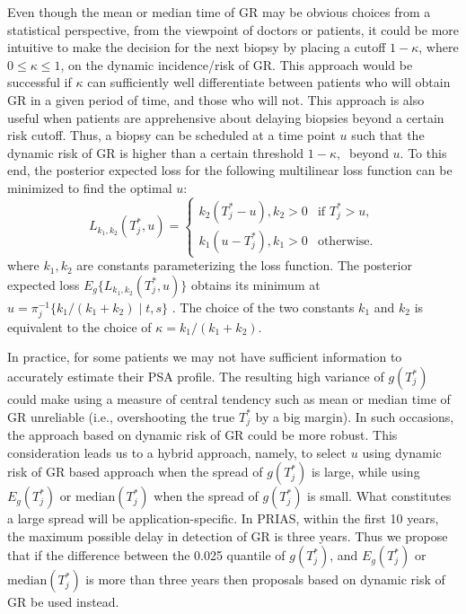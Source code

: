 Even though the mean or median time of GR may be obvious choices from a statistical perspective, from the viewpoint of doctors or patients, it could be more intuitive to make the decision for the next biopsy by placing a cutoff $1 - \kappa$, where $0 \leq \kappa \leq 1$, on the dynamic incidence/risk of GR. This approach would be successful if $\kappa$ can sufficiently well differentiate between patients who will obtain GR in a given period of time, and those who will not. This approach is also useful when patients are apprehensive about delaying biopsies beyond a certain risk cutoff. Thus, a biopsy can be scheduled at a time point $u$ such that the dynamic risk of GR is higher than a certain threshold $1 - \kappa,\ $ beyond $u$. To this end, the posterior expected loss for the following multilinear loss function can be minimized to find the optimal $u$:
\begin{equation}
\label{eq : loss_dynamic_risk}
L_{k_1, k_2}(T^*_j, u) =
    \begin{cases}
      k_2(T^*_j-u), k_2>0 & \text{if } T^*_j > u,\\
      k_1(u-T^*_j), k_1>0 & \text{otherwise}.
    \end{cases}       
\end{equation}
where $k_1, k_2$ are constants parameterizing the loss function. The posterior expected loss $E_g\big\{L_{k_1, k_2}(T^*_j, u)\big\}$ obtains its minimum at $u = \pi_j^{-1}\big\{k_1/{(k_1 + k_2)} \mid t,s \big\}$ \citep{robertBayesianChoice}. The choice of the two constants $k_1$ and $k_2$ is equivalent to the choice of $\kappa = {k_1}/{(k_1 + k_2)}$.

In practice, for some patients we may not have sufficient information to accurately estimate their PSA profile. The resulting high variance of $g(T^*_j)$ could make using a measure of central tendency such as mean or median time of GR unreliable (i.e., overshooting the true $T_j^*$ by a big margin). In such occasions, the approach based on dynamic risk of GR could be more robust. This consideration leads us to a hybrid approach, namely, to select $u$ using dynamic risk of GR based approach when the spread of $g(T_j^*)$ is large, while using $E_g(T^*_j)$ or $\mbox{median}(T^*_j)$ when the spread of $g(T_j^*)$ is small. What constitutes a large spread will be application-specific. In PRIAS, within the first 10 years, the maximum possible delay in detection of GR is three years. Thus we propose that if the difference between the 0.025 quantile of $g(T^*_j)$, and $E_g(T^*_j)$ or $\mbox{median}(T^*_j)$ is more than three years then proposals based on dynamic risk of GR be used instead.